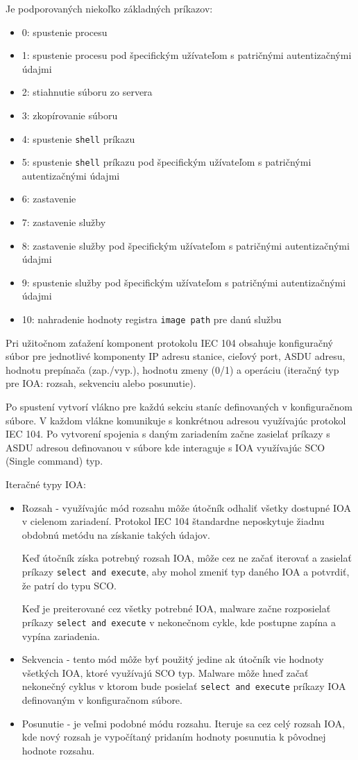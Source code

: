 Je podporovaných niekoľko základných príkazov:
\begin{itemize}
\item 0: spustenie procesu
\item 1: spustenie procesu pod špecifickým užívateľom s patričnými autentizačnými údajmi
\item 2: stiahnutie súboru zo servera
\item 3: zkopírovanie súboru
\item 4: spustenie {\tt shell} príkazu
\item 5: spustenie {\tt shell} príkazu pod špecifickým užívateľom s patričnými autentizačnými údajmi
\item 6: zastavenie
\item 7: zastavenie služby
\item 8: zastavenie služby pod špecifickým užívateľom s patričnými autentizačnými údajmi
\item 9: spustenie služby pod špecifickým užívateľom s patričnými autentizačnými údajmi
\item 10: nahradenie hodnoty registra {\tt image path} pre danú službu
\end{itemize} \par
Pri užitočnom zaťažení komponent protokolu IEC 104 obsahuje konfiguračný súbor pre jednotlivé komponenty IP adresu stanice, cieľový port, ASDU adresu, hodnotu prepínača (zap./vyp.), hodnotu zmeny (0/1) a operáciu (iteračný typ pre IOA: rozsah, sekvenciu alebo posunutie). \par
Po spustení vytvorí vlákno pre každú sekciu staníc definovaných v konfiguračnom súbore. V každom vlákne komunikuje s konkrétnou adresou využívajúc protokol IEC 104. Po vytvorení spojenia s daným zariadením začne zasielať príkazy s ASDU adresou definovanou v súbore kde interaguje s IOA využívajúc SCO (Single command) typ\cite{IoTSec}. \par
Iteračné typy IOA:
\begin{itemize}
\item Rozsah - využívajúc mód rozsahu môže útočník odhaliť všetky dostupné IOA v cielenom zariadení. Protokol IEC 104 štandardne neposkytuje žiadnu obdobnú metódu na získanie takých údajov. \par 
Keď útočník získa potrebný rozsah IOA, môže cez ne začať iterovať a zasielať príkazy {\tt select and execute}, aby mohol zmeniť typ daného IOA a potvrdiť, že patrí do typu SCO. \par
Keď je preiterované cez všetky potrebné IOA, malware začne rozposielať príkazy {\tt select and execute} v nekonečnom cykle, kde postupne zapína a vypína zariadenia.
\item Sekvencia - tento mód môže byť použitý jedine ak útočník vie hodnoty všetkých IOA, ktoré využívajú SCO typ. Malware môže hneď začať nekonečný cyklus v ktorom bude posielať {\tt select and execute} príkazy IOA definovaným v konfiguračnom súbore.
\item Posunutie - je veľmi podobné módu rozsahu. Iteruje sa cez celý rozsah IOA, kde nový rozsah je vypočítaný pridaním hodnoty posunutia k pôvodnej hodnote rozsahu\cite{IoTSec}.
\end{itemize}

